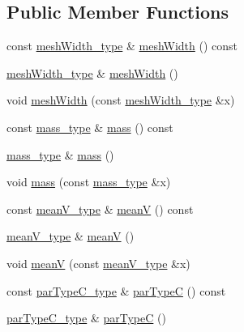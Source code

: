 \subsection*{Public Member Functions}
\begin{DoxyCompactItemize}
\item 
const \hyperlink{classcuboid__t_a5759759b1b9e3029ff36c7f20d9213dc}{mesh\-Width\-\_\-type} \& \hyperlink{classcuboid__t_ad2dc45a3a6fe778095f17a48afe33dd2}{mesh\-Width} () const 
\item 
\hyperlink{classcuboid__t_a5759759b1b9e3029ff36c7f20d9213dc}{mesh\-Width\-\_\-type} \& \hyperlink{classcuboid__t_aa3f7e2375cf92229b67e10134034201d}{mesh\-Width} ()
\item 
void \hyperlink{classcuboid__t_a18109f7e2b099c9e965b8d78f02a9e02}{mesh\-Width} (const \hyperlink{classcuboid__t_a5759759b1b9e3029ff36c7f20d9213dc}{mesh\-Width\-\_\-type} \&x)
\item 
const \hyperlink{classcuboid__t_a365536fb1db29c6ef0da234297763d61}{mass\-\_\-type} \& \hyperlink{classcuboid__t_ad3c09a2fd500ca03fa5bd0a8e70de5bf}{mass} () const 
\item 
\hyperlink{classcuboid__t_a365536fb1db29c6ef0da234297763d61}{mass\-\_\-type} \& \hyperlink{classcuboid__t_a886b32175330faa8cf5b3b4a6d5f962b}{mass} ()
\item 
void \hyperlink{classcuboid__t_a819aa170a5430d8e58e8c8bd21690655}{mass} (const \hyperlink{classcuboid__t_a365536fb1db29c6ef0da234297763d61}{mass\-\_\-type} \&x)
\item 
const \hyperlink{classcuboid__t_aea1381b8b1cca3f677ae4a28b29cbe2a}{mean\-V\-\_\-type} \& \hyperlink{classcuboid__t_a91b634b6561023a36e4da1957394c3fb}{mean\-V} () const 
\item 
\hyperlink{classcuboid__t_aea1381b8b1cca3f677ae4a28b29cbe2a}{mean\-V\-\_\-type} \& \hyperlink{classcuboid__t_aa4d3de66ea96cd11a2402e8d68b49b98}{mean\-V} ()
\item 
void \hyperlink{classcuboid__t_a58ad62869916aaef7c04fe400b39e4c0}{mean\-V} (const \hyperlink{classcuboid__t_aea1381b8b1cca3f677ae4a28b29cbe2a}{mean\-V\-\_\-type} \&x)
\item 
const \hyperlink{classcuboid__t_a162caafd069fa127809bb2d573c752c5}{par\-Type\-C\-\_\-type} \& \hyperlink{classcuboid__t_a923b33f2683e0df94603c429547be912}{par\-Type\-C} () const 
\item 
\hyperlink{classcuboid__t_a162caafd069fa127809bb2d573c752c5}{par\-Type\-C\-\_\-type} \& \hyperlink{classcuboid__t_aa70a57aa669fdf89f3ed1d464c9c9cf7}{par\-Type\-C} ()

\end{DoxyCompactItemize}
